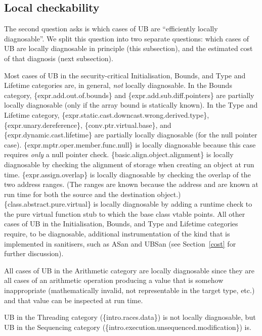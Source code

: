 \subsection{Local checkability}
\label{locally}

The second question \cite{P3656R1} asks is which cases of UB are ``efficiently locally diagnosable''. We split this question into two separate questions: which cases of UB are locally diagnosable in principle (this subsection), and the estimated cost of that diagnosis (next subsection).

Most cases of UB in the security-critical Initialisation, Bounds, and Type and Lifetime categories are, in general, \emph{not} locally diagnosable.  In the Bounds category, 
\{expr.add.out.of.bounds\} 
and \{expr.add.sub.diff.pointers\} 
are partially locally diagnosable (only if the array bound is statically known). In the Type and Lifetime category,
\{expr.static.cast.downcast.wrong.derived.type\},
\{expr.unary.dereference\}, 
\{conv.ptr.virtual.base\}, and
\{expr.dynamic.cast.lifetime\}
are partially locally diagnosable (for the null pointer case).
\{expr.mptr.oper.member.func.null\} is locally diagnosable because this case requires \emph{only} a null pointer check.
\{basic.align.object.alignment\} is locally diagnosable by checking the alignment of storage when creating an object at run time.
\{expr.assign.overlap\} is locally diagnosable by checking the overlap of the two address ranges. (The ranges are known because the address and  are known at run time for both the source and the destination object.) \{class.abstract.pure.virtual\} is locally diagnosable by adding a runtime check to  the pure virtual function stub to which the base class vtable points. All other cases of UB in the Initialisation, Bounds, and Type and Lifetime categories require, to be diagnosable, additional instrumentation of the kind that is implemented in sanitisers, such as ASan and UBSan (see Section~\ref{cost} for further discussion).

All cases of UB in the Arithmetic category are locally diagnosable since they are all cases of an arithmetic operation producing a value that is somehow inappropriate (mathematically invalid, not representable in the target type, etc.) and that value can be inspected at run time.

UB in the Threading category (\{intro.races.data\}) is not locally diagnosable, but UB in the Sequencing category (\{intro.execution.unsequenced.modification\}) is. 

